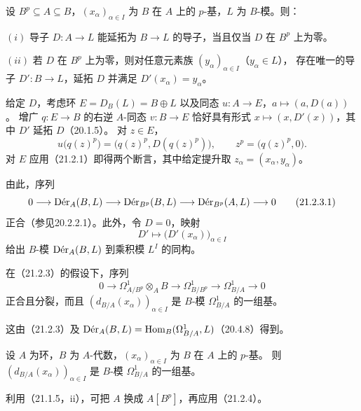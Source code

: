 设 $B^p\subseteq A\subseteq B$，$(x_\alpha)_{\alpha\in I}$ 为 $B$ 在 $A$ 上的 $p$-基，$L$ 为 $B$-模。则：

$(i)$ 导子 $D:A\to L$ 能延拓为 $B\to L$ 的导子，当且仅当 $D$ 在 $B^p$ 上为零。

$(ii)$ 若 $D$ 在 $B^p$ 上为零，则对任意元素族 $(y_\alpha)_{\alpha\in I}$（$y_\alpha\in L$），
存在唯一的导子 $D':B\to L$，延拓 $D$ 并满足 $D'(x_\alpha)=y_\alpha$。

\eproof
给定 $D$，考虑环 $E=D_B(L)=B\oplus L$ 以及同态
$u:A\to E$，$a\mapsto(a,D(a))$。
增广 $q:E\to B$ 的右逆 $A$-同态 $v:B\to E$ 恰好具有形式
$x\mapsto(x,D'(x))$，其中 $D'$ 延拓 $D$（20.1.5）。
对 $z\in E$，
\[
 u\bigl(q(z)^p\bigr)=\bigl(q(z)^p,D(q(z)^p)\bigr),
 \qquad z^p=\bigl(q(z)^p,0\bigr).
\]
对 $E$ 应用（21.2.1）即得两个断言，其中给定提升取
$z_\alpha=(x_\alpha,y_\alpha)$。
\finishproof

由此，序列
\begin{equation}
 0\longrightarrow\Der_A(B,L)\longrightarrow\Der_{B^p}(B,L)
 \longrightarrow\Der_{B^p}(A,L)\longrightarrow0
 \tag{21.2.3.1}
\end{equation}
正合（参见20.2.2.1）。此外，令 $D=0$，映射
\begin{equation}
 D'\longmapsto\bigl(D'(x_\alpha)\bigr)_{\alpha\in I}
 \tag{21.2.3.2}
\end{equation}
给出 $B$-模 $\Der_A(B,L)$ 到乘积模 $L^I$ 的同构。

在（21.2.3）的假设下，序列
\begin{equation}
 0\longrightarrow\Omega^1_{A/B^p}\otimes_A B
 \longrightarrow\Omega^1_{B/B^p}
 \longrightarrow\Omega^1_{B/A}\longrightarrow0
 \tag{21.2.4.1}
\end{equation}
正合且分裂，而且 $(d_{B/A}(x_\alpha))_{\alpha\in I}$ 是 $B$-模
$\Omega^1_{B/A}$ 的一组基。

这由（21.2.3）及
$\Der_A(B,L)=\Hom_B(\Omega^1_{B/A},L)$（20.4.8）得到。

设 $A$ 为环，$B$ 为 $A$-代数，$(x_\alpha)_{\alpha\in I}$ 为 $B$ 在 $A$ 上的 $p$-基。
则 $(d_{B/A}(x_\alpha))_{\alpha\in I}$ 是 $B$-模 $\Omega^1_{B/A}$ 的一组基。

利用（21.1.5，ii），可把 $A$ 换成 $A[B^p]$，再应用（21.2.4）。

